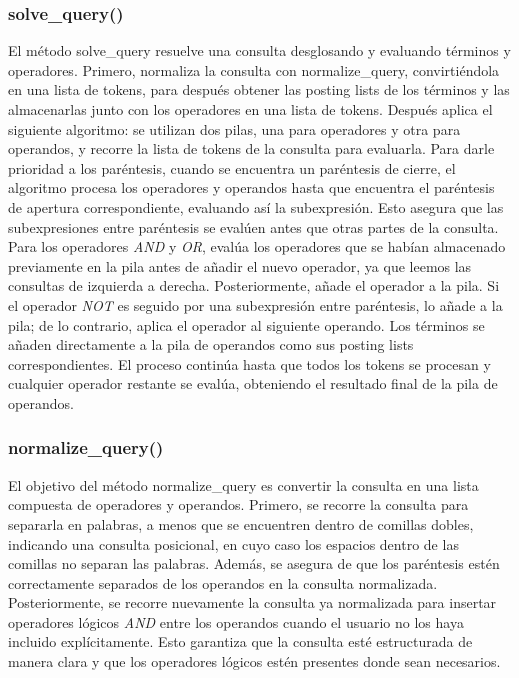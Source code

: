 \documentclass[12pt,a4paper]{article}
\begin{document}
\subsubsection{solve\_query()}
El método solve\_query resuelve una consulta desglosando y evaluando términos y operadores. Primero, normaliza la consulta con normalize\_query, convirtiéndola en una lista de tokens, para después obtener las posting lists de los términos y las almacenarlas junto con los operadores en una lista de tokens.
Después aplica el siguiente algoritmo: se utilizan dos pilas, una para operadores y otra para operandos, y recorre la lista de tokens de la consulta para evaluarla. Para darle prioridad a los paréntesis, cuando se encuentra un paréntesis de cierre, el algoritmo procesa los operadores y operandos hasta que encuentra el paréntesis de apertura correspondiente, evaluando así la subexpresión. Esto asegura que las subexpresiones entre paréntesis se evalúen antes que otras partes de la consulta. Para los operadores \textit{AND} y \textit{OR}, evalúa los operadores que se habían almacenado previamente en la pila antes de añadir el nuevo operador, ya que leemos las consultas de izquierda a derecha. Posteriormente, añade el operador a la pila. Si el operador \textit{NOT} es seguido por una subexpresión entre paréntesis, lo añade a la pila; de lo contrario, aplica el operador al siguiente operando. Los términos se añaden directamente a la pila de operandos como sus posting lists correspondientes. El proceso continúa hasta que todos los tokens se procesan y cualquier operador restante se evalúa, obteniendo el resultado final de la pila de operandos. 

\subsubsection{normalize\_query()}
El objetivo del método normalize\_query es convertir la consulta en una lista compuesta de operadores y operandos. Primero, se recorre la consulta para separarla en palabras, a menos que se encuentren dentro de comillas dobles, indicando una consulta posicional, en cuyo caso los espacios dentro de las comillas no separan las palabras. Además, se asegura de que los paréntesis estén correctamente separados de los operandos en la consulta normalizada. Posteriormente, se recorre nuevamente la consulta ya normalizada para insertar operadores lógicos \textit{AND} entre los operandos cuando el usuario no los haya incluido explícitamente. Esto garantiza que la consulta esté estructurada de manera clara y que los operadores lógicos estén presentes donde sean necesarios.
\end{document}
